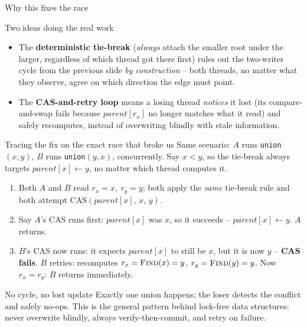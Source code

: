 \documentclass[11pt,aspectratio=169]{beamer}
\begin{document}
\begin{frame}{Why this fixes the race}
  \begin{exampleblock}{Two ideas doing the real work}
    \begin{itemize}
      \item The \textbf{deterministic tie-break} (\emph{always} attach the smaller
      root under the larger, regardless of which thread got there first) rules out
      the two-writer cycle from the previous slide \emph{by construction} -- both
      threads, no matter what they observe, agree on which direction the edge must
      point.
      \item The \textbf{CAS-and-retry loop} means a losing thread \emph{notices} it
      lost (its compare-and-swap fails because $parent[r_x]$ no longer matches what
      it read) and safely recomputes, instead of overwriting blindly with stale
      information.
    \end{itemize}
  \end{exampleblock}
\end{frame}

\begin{frame}{Tracing the fix on the exact race that broke us}
  Same scenario: $A$ runs \texttt{union}$(x,y)$, $B$ runs \texttt{union}$(y,x)$,
  concurrently. Say $x < y$, so the tie-break always targets
  $parent[x] \gets y$, no matter which thread computes it.
  \begin{enumerate}
    \item Both $A$ and $B$ read $r_x = x,\ r_y = y$; both apply the \emph{same}
    tie-break rule and both attempt $\text{CAS}(parent[x],\, x,\, y)$.
    \item Say $A$'s CAS runs first: $parent[x]$ was $x$, so it succeeds --
    $parent[x] \gets y$. $A$ returns.
    \item $B$'s CAS now runs: it expects $parent[x]$ to still be $x$, but it is now
    $y$ -- \textbf{CAS fails}. $B$ retries: recomputes $r_x = \textsc{Find}(x) = y$,
    $r_y = \textsc{Find}(y) = y$. Now $r_x = r_y$: $B$ returns immediately.
  \end{enumerate}
  \begin{exampleblock}{No cycle, no lost update}
    Exactly one union happens; the loser detects the conflict and safely no-ops. This
    is the general pattern behind lock-free data structures: never overwrite blindly,
    always verify-then-commit, and retry on failure.
  \end{exampleblock}
\end{frame}
\end{document}
